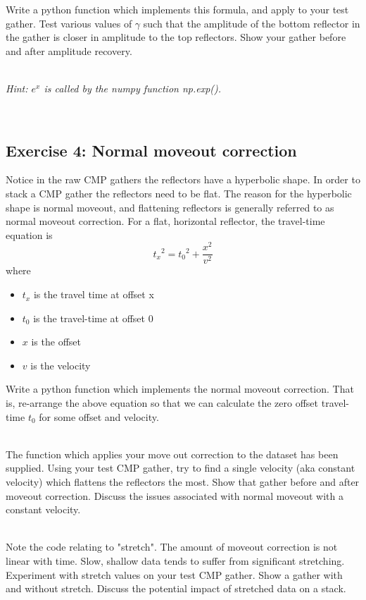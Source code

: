 Write a python function which implements this formula, and apply to your test gather.  Test various values of $\gamma$ such that the amplitude of the bottom reflector in the gather is closer in amplitude to the top reflectors. Show your gather before and after amplitude recovery. 
\par~\\
\emph{Hint: $e^x$ is called by the numpy function np.exp().}
\par~\\

\subsection*{Exercise 4: Normal moveout correction}
Notice in the raw CMP gathers the reflectors have a hyperbolic shape.  In order to stack a CMP gather the reflectors need to be flat.  The reason for the hyperbolic shape is normal moveout, and flattening reflectors is generally referred to as normal moveout correction.  For a flat, horizontal reflector, the travel-time equation is
\[ {t_x}^2 = {t_0}^2 + \frac{x^2}{v^2}\]
where
\begin{itemize}
\item $t_x$ is the travel time at offset x
\item $t_0$ is the travel-time at offset 0
\item $x$ is the offset
\item $v$ is the velocity
\end{itemize}
Write a python function which implements the normal moveout correction. That is, re-arrange the above equation so that we can calculate the zero offset travel-time $t_0$ for some offset and velocity.
\par~\\
The function which applies your move out correction to the dataset has been supplied. Using your test CMP gather, try to find a single velocity (aka constant velocity) which flattens the reflectors the most. Show that gather before and after moveout correction.  Discuss the issues associated with normal moveout with a constant velocity.
\par~\\
Note the code relating to "stretch".  The amount of moveout correction is not linear with time. Slow, shallow data tends to suffer from significant stretching. Experiment with stretch values on your test CMP gather. Show a gather with and without stretch.  Discuss the potential impact of stretched data on a stack.


